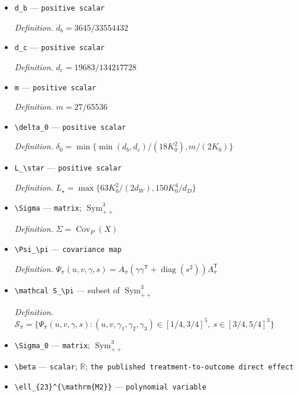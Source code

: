 \documentclass{article}
\begin{document}
\begin{itemize}
  \item \texttt{d\_\allowbreak{}b} --- \texttt{positive scalar}
  \par\smallskip\noindent\emph{Definition.} \(d_b=3645/33554432\)
  \item \texttt{d\_\allowbreak{}c} --- \texttt{positive scalar}
  \par\smallskip\noindent\emph{Definition.} \(d_c=19683/134217728\)
  \item \texttt{m} --- \texttt{positive scalar}
  \par\smallskip\noindent\emph{Definition.} \(m=27/65536\)
  \item \texttt{\textbackslash{}\allowbreak{}delta\_\allowbreak{}0} --- \texttt{positive scalar}
  \par\smallskip\noindent\emph{Definition.} \(\delta_0=\min\{\min(d_b,d_c)/(18K_0^2),m/(2K_0)\}\)
  \item \texttt{L\_\allowbreak{}\textbackslash{}\allowbreak{}star} --- \texttt{positive scalar}
  \par\smallskip\noindent\emph{Definition.} \(L_\star=\max\{63K_0^2/(2d_W),150K_0^4/d_D\}\)
  \item \texttt{\textbackslash{}\allowbreak{}Sigma} --- \texttt{matrix}; \(\operatorname{Sym}_{++}^3\)
  \par\smallskip\noindent\emph{Definition.} \(\Sigma=\operatorname{Cov}_P(X)\)
  \item \texttt{\textbackslash{}\allowbreak{}Psi\_\allowbreak{}\textbackslash{}\allowbreak{}pi} --- \texttt{covariance map}
  \par\smallskip\noindent\emph{Definition.} \(\Psi_\pi(u,v,\gamma,s)=A_\pi(\gamma\gamma^{\mathsf T}+\operatorname{diag}(s^2))A_\pi^{\mathsf T}\)
  \item \texttt{\textbackslash{}\allowbreak{}mathcal S\_\allowbreak{}\textbackslash{}\allowbreak{}pi} --- subset of \(\operatorname{Sym}_{++}^3\)
  \par\smallskip\noindent\emph{Definition.} \(\mathcal S_\pi=\{\Psi_\pi(u,v,\gamma,s):(u,v,\gamma_1,\gamma_2,\gamma_3)\in[1/4,3/4]^5,\ s\in[3/4,5/4]^3\}\)
  \item \texttt{\textbackslash{}\allowbreak{}Sigma\_\allowbreak{}0} --- \texttt{matrix}; \(\operatorname{Sym}_{++}^3\)
  \item \texttt{\textbackslash{}\allowbreak{}beta} --- \texttt{scalar}; \(\mathbb R\); \texttt{the published treatment-\allowbreak{}to-\allowbreak{}outcome direct effect}
  \item \texttt{\textbackslash{}\allowbreak{}ell\_\allowbreak{}\{23\}\allowbreak{}\textasciicircum{}\{\textbackslash{}\allowbreak{}mathrm\{M2\}\allowbreak{}\}\allowbreak{}} --- \texttt{polynomial variable}

\end{itemize}
\end{document}
